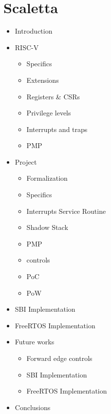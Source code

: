 \chapter*{Scaletta}
\label{cha:Scaletta}

\begin{itemize}
  \item Introduction

  \item RISC-V
    \begin{itemize}
      \item Specifics

      \item Extensions

      \item Registers \& CSRs

      \item Privilege levels

      \item Interrupts and traps

      \item PMP
    \end{itemize}

  \item Project
    \begin{itemize}
      \item Formalization

      \item Specifics

      \item Interrupts Service Routine

      \item Shadow Stack

      \item PMP

      \item controls

      \item PoC

      \item PoW
    \end{itemize}

  \item SBI Implementation

  \item FreeRTOS Implementation

  \item Future works
    \begin{itemize}
      \item Forward edge controls

      \item SBI Implementation

      \item FreeRTOS Implementation
    \end{itemize}

  \item Conclusions
\end{itemize}

